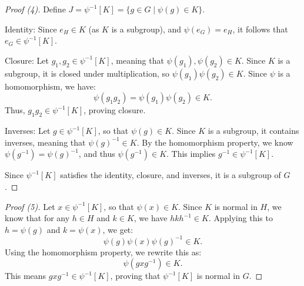 \documentclass[12pt]{article}
\begin{document}
\begin{proof}[Proof (4)]
    Define \(J = \psi^{-1}[K] = \{ g \in G \mid \psi(g) \in K \}\).

    \noindent 
    Identity: Since \(e_H \in K\) (as \(K\) is a subgroup), 
    and \(\psi(e_G) = e_H\), it follows that \(e_G \in \psi^{-1}[K]\).

    \noindent 
    Closure: Let \(g_1, g_2 \in \psi^{-1}[K]\), 
    meaning that \(\psi(g_1), \psi(g_2) \in K\). Since \(K\) is a subgroup, 
    it is closed under multiplication, so \(\psi(g_1) \psi(g_2) \in K\). 
    Since \(\psi\) is a homomorphism, we have:
    \[
        \psi(g_1 g_2) = \psi(g_1) \psi(g_2) \in K.
    \]
    Thus, \(g_1 g_2 \in \psi^{-1}[K]\), proving closure.

    \noindent 
    Inverses: Let \(g \in \psi^{-1}[K]\), so that \(\psi(g) \in K\). 
    Since \(K\) is a subgroup, it contains inverses, meaning that \(\psi(g)^{-1} \in K\). 
    By the homomorphism property, we know \(\psi(g^{-1}) = \psi(g)^{-1}\), 
    and thus \(\psi(g^{-1}) \in K\). This implies \(g^{-1} \in \psi^{-1}[K]\).

    \noindent 
    Since \(\psi^{-1}[K]\) satisfies the identity, closure, and inverses, 
    it is a subgroup of \(G\).
\end{proof}
\begin{proof}[Proof (5)]
    Let \(x \in \psi^{-1}[K]\), so that \(\psi(x) \in K\). 
    Since \(K\) is normal in \(H\), we know that for any \(h \in H\) 
    and \(k \in K\), we have \(h k h^{-1} \in K\). Applying this to \(h = \psi(g)\) 
    and \(k = \psi(x)\), we get:
    \[
        \psi(g) \psi(x) \psi(g)^{-1} \in K.
    \]
    Using the homomorphism property, we rewrite this as:
    \[
        \psi(g x g^{-1}) \in K.
    \]
    This means \(g x g^{-1} \in \psi^{-1}[K]\), proving that \(\psi^{-1}[K]\) 
    is normal in \(G\).
\end{proof}
\end{document}
